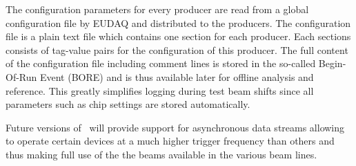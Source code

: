 The configuration parameters for every producer are read from a global configuration file by EUDAQ and distributed to the producers. 
The configuration file is a plain text file which contains one section for each producer. 
Each sections consists of tag-value pairs for the configuration of this producer. 
The full content of the configuration file including comment lines is stored in the so-called Begin-Of-Run Event (BORE) and is thus available later for offline analysis and reference. 
This greatly simplifies logging during test beam shifts since all parameters such as chip settings are stored automatically.

Future versions of \eudaq\ will provide support for asynchronous data streams
 allowing to operate certain devices at a much higher trigger frequency than others and thus making full use of the the beams available in the various beam lines.
